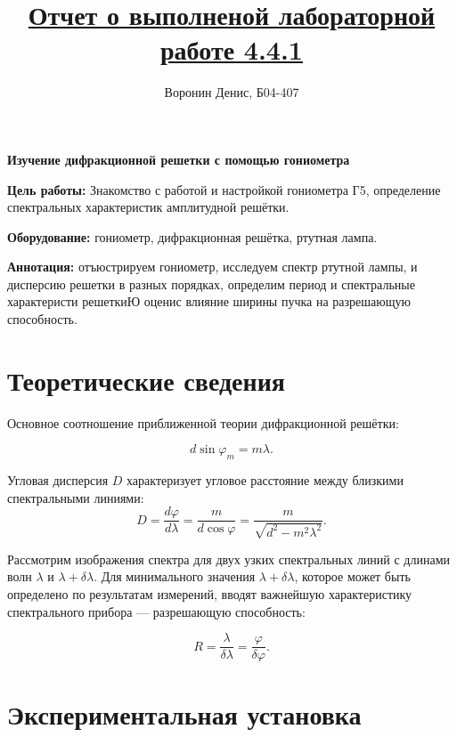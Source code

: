 \documentclass[a4paper]{article}
\title{\underline{Отчет о выполненой лабораторной работе 4.4.1}}
\author{Воронин Денис, Б04-407}
\begin{document}
\maketitle

\begin{center}
\textbf{\Large Изучение дифракционной решетки с помощью гониометра}
\end{center}

\textbf{Цель работы:}  Знакомство с работой и настройкой гониометра Г5,
определение спектральных характеристик амплитудной решётки.\par

\textbf{Оборудование:} гониометр, дифракционная решётка,
ртутная лампа.

\textbf{Аннотация:} отъюстрируем гониометр, исследуем спектр ртутной лампы, и дисперсию решетки в разных порядках, 
определим период и спектральные характеристи решеткиЮ оценис влияние ширины пучка на разрешающую способность.

\section{Теоретические сведения}

Основное соотношение приближенной теории дифракционной решётки:

	\begin{equation}
	d\sin \varphi_m = m\lambda.
 \label{main}
	\end{equation}
 
Угловая дисперсия $D$ характеризует угловое расстояние между близкими спектральными линиями:
	\begin{equation}
	D = \frac{d\varphi}{d\lambda} = \frac{m}{d \cos \varphi}=\frac{m}{\sqrt{d^{2}-m^{2} \lambda^{2}}}.
	\label{Dispersion}
	\end{equation}

Рассмотрим изображения спектра для двух узких спектральных линий с длинами волн $\lambda$ и $\lambda+\delta\lambda$. Для минимального значения $\lambda+\delta\lambda$, которое может быть определено по результатам измерений, вводят важнейшую характеристику спектрального прибора — разрешающую способность:

\begin{equation}
    R=\frac{\lambda}{\delta\lambda} = \frac{\varphi}{\delta \varphi}.
\end{equation}

\section{Экспериментальная установка}
\end{document}
